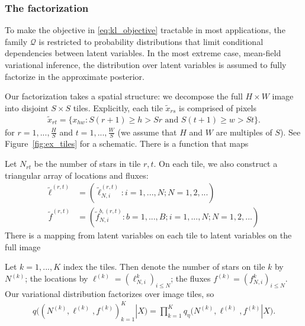 \subsubsection{The factorization}
To make the objective in \eqref{eq:kl_objective} tractable in most 
applications, the family $\mathcal{Q}$ is restricted to probability distributions 
that limit conditional dependencies between latent variables. In the most extreme case, mean-field variational inference, 
the distribution over latent variables is assumed to fully factorize in the approximate posterior. 

Our factorization takes a spatial structure: we decompose the full $H \times W$ image into disjoint $S \times S$ tiles. Explicitly, each tile $\tilde x_{rs}$ is comprised of pixels 
\begin{align}
    \tilde x_{rt} = \{x_{hw} : S(r+1) \geq h > Sr \text{ and } S(t+1) \geq w > St\}.
\end{align}
for $r = 1, ..., \frac{H}{S}$ and $t = 1, ..., \frac{W}{S}$ (we assume that $H$ and $W$ are multiples of $S$). See Figure~\ref{fig:ex_tiles} for a schematic. 
There is a function that maps 

Let $N_{rt}$ be the number of stars in tile $r, t$. 
On each tile, we also construct a triangular array of 
locations and fluxes:
\begin{align}
    \tilde\ell^{(r,t)} &= (\tilde\ell_{N, i}^{(r,t)} : i = 1, ..., N; N = 1, 2, ...) \\
    \tilde f^{(r,t)} &= (\tilde f_{N, i}^{b, (r,t)} : 
    b = 1, ..., B; i = 1, ..., N; N = 1, 2, ...)
\end{align}
There is a mapping from latent variables on each tile to latent variables on the full image 



Let $k = 1, ..., K$ index the tiles. Then
denote the number of stars on tile $k$ by $N^{(k)}$;
the locations by $\ell^{(k)} = (\ell_{N, i}^k)_{i \leq N}$; 
the fluxes $f^{(k)} = (f_{N, i}^k)_{i \leq N}$. Our variational 
distribution factorizes over image tiles, so
\begin{align}
    q\big((N^{(k)}, \ell^{(k)}, f^{(k)})_{k = 1}^K|X\big) = \prod_{k = 1}^K q_\eta\big(N^{(k)}, \ell^{(k)}, f^{(k)} | X\big). 
\end{align}

